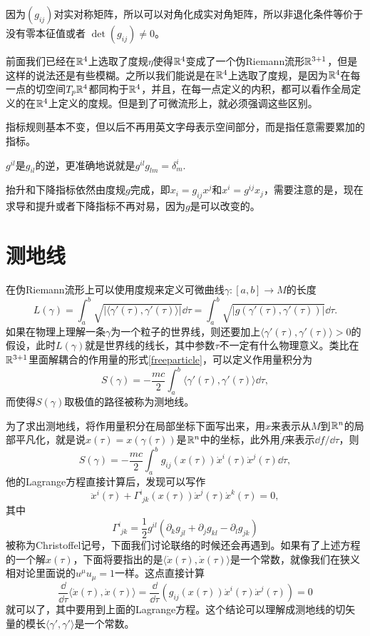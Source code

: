 因为$(g_{ij})$对实对称矩阵，所以可以对角化成实对角矩阵，所以非退化条件等价于没有零本征值或者
$\det (g_{ij})\neq 0$。

前面我们已经在$\mathbb{R}^4$上选取了度规$\eta$使得$\mathbb{R}^4$变成了一个伪Riemann流形$\mathbb{R}^{3+1}$，但是这样的说法还是有些模糊。之所以我们能说是在$\mathbb{R}^4$上选取了度规，是因为$\mathbb{R}^4$在每一点的切空间$T_p\mathbb{R}^4$都同构于$\mathbb{R}^4$，并且，在每一点定义的内积，都可以看作全局定义的在$\mathbb{R}^4$上定义的度规。但是到了可微流形上，就必须强调这些区别。

指标规则基本不变，但以后不再用英文字母表示空间部分，而是指任意需要累加的指标。

$g^{il}$是$g_{il}$的逆，更准确地说就是$g^{il}g_{lm}=\delta^i_m$.

抬升和下降指标依然由度规$g$完成，即$x_i=g_{ij}x^j$和$x^i=g^{ij}x_j$，需要注意的是，现在求导和提升或者下降指标不再对易，因为$g$是可以改变的。
\section{测地线}
在伪Riemann流形上可以使用度规来定义可微曲线$\gamma:[a,b]\to M$的长度
\[
	L(\gamma)=\int_a^b \sqrt{|\langle\gamma'(\tau),\gamma'(\tau)\rangle|}\dd \tau=\int_a^b \sqrt{|g(\gamma'(\tau),\gamma'(\tau))|}\dd \tau.
\]
如果在物理上理解一条$\gamma$为一个粒子的世界线，则还要加上$\langle\gamma'(\tau),\gamma'(\tau)\rangle>0$的假设，此时$L(\gamma)$就是世界线的线长，其中参数$\tau$不一定有什么物理意义。类比在$\mathbb{R}^{3+1}$里面解耦合的作用量的形式\eqref{freeparticle}，可以定义作用量积分为
\[
	S(\gamma)=-\frac{mc}{2}\int_a^b \langle\gamma'(\tau),\gamma'(\tau)\rangle\dd \tau,
\]
而使得$S(\gamma)$取极值的路径被称为测地线。

为了求出测地线，将作用量积分在局部坐标下面写出来，用$x$来表示从$M$到$\mathbb{R}^n$的局部平凡化，就是说$x(\tau)=x(\gamma(\tau))$是$\mathbb{R}^n$中的坐标，此外用$\dot{f}$来表示$\dd f/\dd \tau$，则
\[
	S(\gamma)=-\frac{mc}{2}\int_a^b g_{ij}(x(\tau))\dot{x}^i(\tau)\dot{x}^j(\tau)\dd \tau,
\]
他的Lagrange方程直接计算后，发现可以写作
\[
	\ddot{x}^i(\tau)+\Gamma^i_{\phantom{i}jk}(x(\tau))\dot{x}^j(\tau)\dot{x}^k(\tau)=0,
\]
其中
\[
	\Gamma^i_{\phantom{i}jk}=\frac{1}{2}g^{il}(\partial_k g_{jl}+\partial_j g_{kl}-\partial_l g_{jk})
\]
被称为Christoffel记号，下面我们讨论联络的时候还会再遇到。如果有了上述方程的一个解$x(\tau)$，下面将要指出的是$\langle\dot{x}(\tau),\dot{x}(\tau)\rangle$是一个常数，就像我们在狭义相对论里面说的$u^\mu u_\mu=1$一样。这点直接计算
\[
	\frac{\dd}{\dd \tau}\langle\dot{x}(\tau),\dot{x}(\tau)\rangle=\frac{\dd}{\dd \tau}\left(g_{ij}(x(\tau))\dot{x}^i(\tau)\dot{x}^j(\tau)\right)=0
\]
就可以了，其中要用到上面的Lagrange方程。这个结论可以理解成测地线的切矢量的模长$\langle\gamma',\gamma'\rangle$是一个常数。

